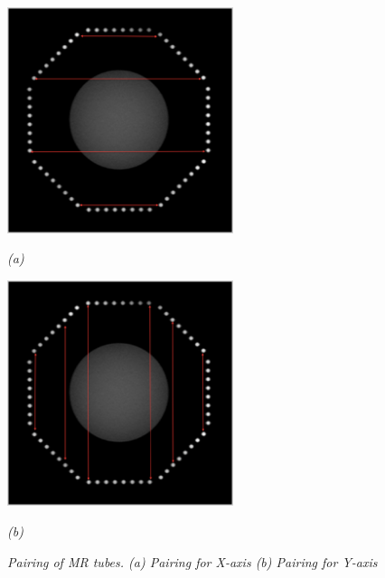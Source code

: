 \begin{figure}[htb]
  \begin{center}
    \begin{minipage}[b]{2.6in}
      \centering
      \centerline{\mbox{\includegraphics[width=2.6in]{parameters/images/tubes_pairing_x.eps}}}
      \centerline{\emph{(a)}}
    \end{minipage}
    \begin{minipage}[b]{2.6in}
      \centering
      \centerline{\mbox{\includegraphics[width=2.6in]{parameters/images/tubes_pairing_y.eps}}}
      \centerline{\emph{(b)}}
    \end{minipage}
  \end{center}
  \caption{\emph{Pairing of MR tubes. (a) Pairing for X-axis (b) Pairing for Y-axis}}
  \label{fig:correction_tube_pairing_xy}
\end{figure}

